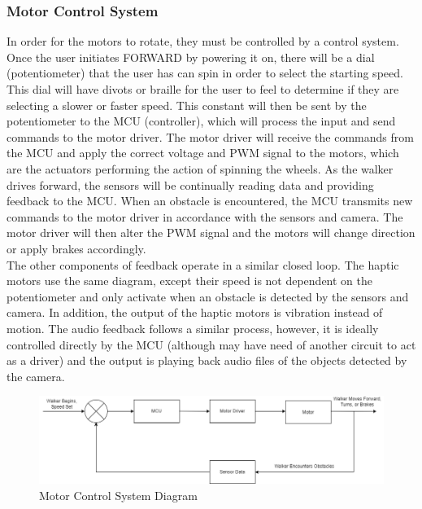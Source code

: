 \subsubsection{Motor Control System}
\noindent In order for the motors to rotate, they must be controlled by a control system. Once the user initiates FORWARD by powering it on, there will be a dial (potentiometer) that the user has can spin in order to select the starting speed. This dial will have divots or braille for the user to feel to determine if they are selecting a slower or faster speed. This constant will then be sent by the potentiometer to the MCU (controller), which will process the input and send commands to the motor driver. The motor driver will receive the commands from the MCU and apply the correct voltage and PWM signal to the motors, which are the actuators performing the action of spinning the wheels. As the walker drives forward, the sensors will be continually reading data and providing feedback to the MCU. When an obstacle is encountered, the MCU transmits new commands to the motor driver in accordance with the sensors and camera. The motor driver will then alter the PWM signal and the motors will change direction or apply brakes accordingly.\\

\noindent The other components of feedback operate in a similar closed loop. The haptic motors use the same diagram, except their speed is not dependent on the potentiometer and only activate when an obstacle is detected by the sensors and camera. In addition, the output of the haptic motors is vibration instead of motion. The audio feedback follows a similar process, however, it is ideally controlled directly by the MCU (although may have need of another circuit to act as a driver) and the output is playing back audio files of the objects detected by the camera.\\

\begin{figure}[H]
	\centering
	\includegraphics[width=1\textwidth]{./Images/control_system_speed}
	\caption{\label{fig:Motor_Control_System}Motor Control System Diagram}
\end{figure}


